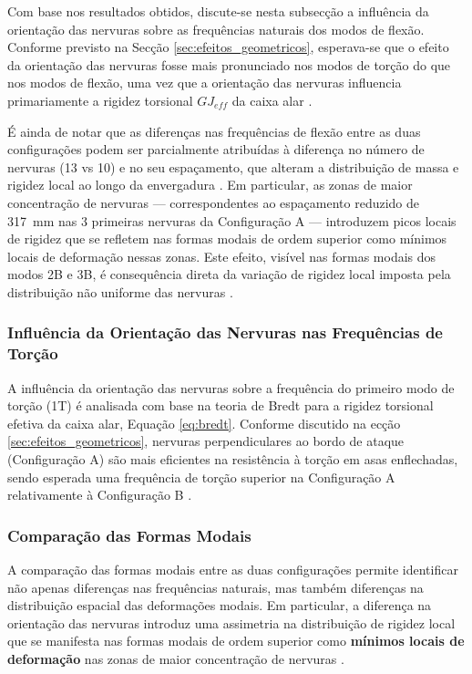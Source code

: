 \documentclass[a4paper,fleqn]{cas-sc}
\begin{document}
Com base nos resultados obtidos, discute-se nesta subsecção a influência da orientação das nervuras sobre as frequências naturais dos modos de flexão. Conforme previsto na Secção \ref{sec:efeitos_geometricos}, esperava-se que o efeito da orientação das nervuras fosse mais pronunciado nos modos de torção do que nos modos de flexão, uma vez que a orientação das nervuras influencia primariamente a rigidez torsional $GJ_{eff}$ da caixa alar \cite{Megson2012, Niu1988}.

É ainda de notar que as diferenças nas frequências de flexão entre as duas configurações podem ser parcialmente atribuídas à diferença no número de nervuras (13 vs 10) e no seu espaçamento, que alteram a distribuição de massa e rigidez local ao longo da envergadura \cite{Craig2006}. Em particular, as zonas de maior concentração de nervuras --- correspondentes ao espaçamento reduzido de \SI{317}{\milli\meter} nas 3 primeiras nervuras da Configuração A --- introduzem picos locais de rigidez que se refletem nas formas modais de ordem superior como mínimos locais de deformação nessas zonas. Este efeito, visível nas formas modais dos modos 2B e 3B, é consequência direta da variação de rigidez local imposta pela distribuição não uniforme das nervuras \cite{Rao2011, Bathe2014}.

\subsubsection{Influência da Orientação das Nervuras nas 
Frequências de Torção}

A influência da orientação das nervuras sobre a frequência do primeiro modo de torção (1T) é analisada com base na teoria de Bredt para a rigidez torsional efetiva da caixa alar, Equação \eqref{eq:bredt}. Conforme discutido na 
ecção \ref{sec:efeitos_geometricos}, nervuras perpendiculares ao bordo de ataque (Configuração A) são mais eficientes na resistência à torção em asas enflechadas, sendo esperada uma frequência de torção superior na Configuração A relativamente à Configuração B \cite{Niu1988, Megson2012}.

\subsubsection{Comparação das Formas Modais}

A comparação das formas modais entre as duas configurações permite identificar não apenas diferenças nas frequências naturais, mas também diferenças na distribuição espacial das deformações modais. Em particular, a diferença na orientação das nervuras introduz uma assimetria na distribuição de rigidez local que se manifesta nas formas modais de ordem superior como \textbf{mínimos locais de deformação} nas zonas de maior concentração de nervuras \cite{Bathe2014, Cook2001}.
\end{document}
